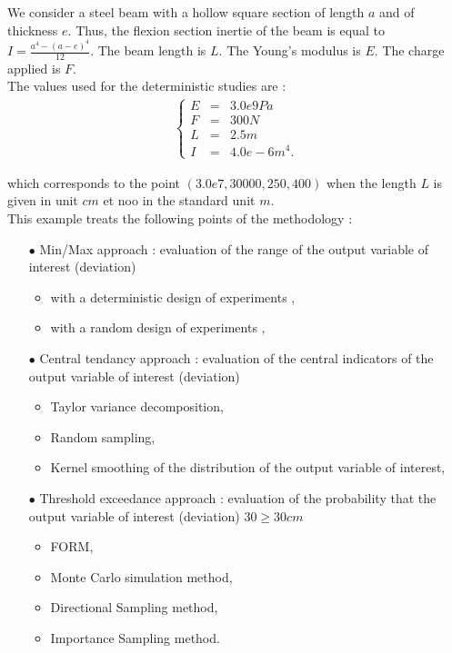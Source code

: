 \documentclass[11pt]{article}
\begin{document}
We consider a steel beam with a hollow square section of length $a$ and of thickness $e$. Thus, the flexion section inertie of the beam is equal to $I = \displaystyle \frac{a^4 - (a-e)^4}{12}$. The beam length is $L$. The Young's modulus is $E$. The charge applied is $F$.\\

The  values used for the deterministic studies are :
\begin{align*}
  \left\{
  \begin{array}{lcl}
    E & = & 3.0e9 Pa\\
    F & = & 300 N\\
    L & = & 2.5m\\
    I & = & 4.0e-6 m^4.
  \end{array}
  \right.
\end{align*}

which corresponds to the point $(3.0e7, 30000, 250, 400)$ when the length $L$ is given in unit $cm$ et noo in the standard unit $m$.\\


This example treats the following points of the methodology :
\begin{itemize}
\item[$\bullet$] Min/Max approach : evaluation of the range of the output variable of interest (deviation)
  \begin{itemize}
  \item with a deterministic design of experiments ,
  \item with a random design of experiments ,
  \end{itemize}
\item[$\bullet$] Central tendancy approach : evaluation of the central indicators of the output variable of interest (deviation)
  \begin{itemize}
  \item Taylor variance decomposition,
  \item Random sampling,
  \item Kernel smoothing of the distribution of the output variable of interest,
  \end{itemize}
\item[$\bullet$] Threshold exceedance approach : evaluation of the probability that the output variable of interest (deviation) 30$\geq 30cm$
  \begin{itemize}
  \item FORM,
  \item Monte Carlo simulation method,
  \item Directional Sampling method,
  \item Importance Sampling method.
  \end{itemize}
\end{itemize}
\end{document}
